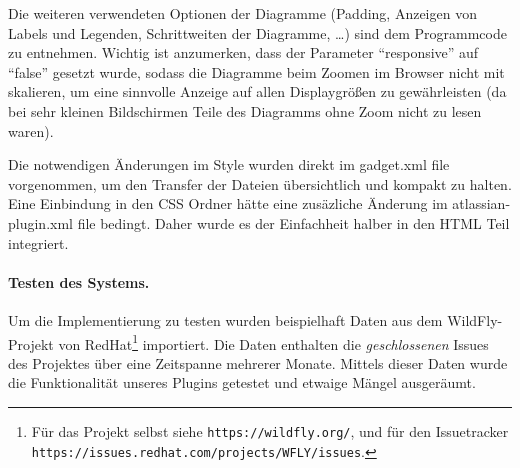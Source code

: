 \documentclass[a4paper,12pt,]{article}
\begin{document}
Die weiteren verwendeten Optionen der Diagramme (Padding, Anzeigen von Labels und Legenden, Schrittweiten der Diagramme, \dots) sind dem Programmcode zu entnehmen.
Wichtig ist anzumerken, dass der Parameter ``responsive'' auf ``false'' gesetzt wurde, sodass die Diagramme beim Zoomen im Browser nicht mit skalieren, um eine sinnvolle Anzeige auf allen Displaygrößen zu gewährleisten (da bei sehr kleinen Bildschirmen Teile des Diagramms ohne Zoom nicht zu lesen waren).

Die notwendigen Änderungen im Style wurden direkt im gadget.xml file vorgenommen, um den Transfer der Dateien übersichtlich und kompakt zu halten. Eine Einbindung in den CSS Ordner hätte eine zusäzliche Änderung im atlassian-plugin.xml file bedingt. Daher wurde es der Einfachheit halber in den HTML Teil integriert.

\paragraph{Testen des Systems.} Um die Implementierung zu testen wurden beispielhaft Daten aus dem WildFly-Projekt von RedHat\footnote{Für das Projekt selbst siehe {\tt https://wildfly.org/}, und für den Issuetracker {\tt https://issues.redhat.com/projects/WFLY/issues}.} importiert. Die Daten enthalten die \emph{geschlossenen} Issues des Projektes über eine Zeitspanne mehrerer Monate. Mittels dieser Daten wurde die Funktionalität unseres Plugins getestet und etwaige Mängel ausgeräumt.
\end{document}
